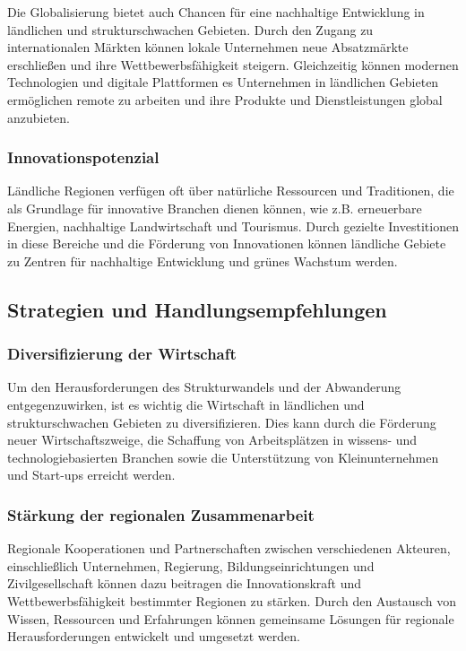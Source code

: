Die Globalisierung bietet auch Chancen für eine nachhaltige Entwicklung in ländlichen und strukturschwachen Gebieten. Durch den Zugang zu internationalen Märkten können lokale Unternehmen neue Absatzmärkte erschließen und ihre Wettbewerbsfähigkeit steigern. Gleichzeitig können modernen Technologien und digitale Plattformen es Unternehmen in ländlichen Gebieten ermöglichen remote zu arbeiten und ihre Produkte und Dienstleistungen global anzubieten.

\subsubsection{Innovationspotenzial}

Ländliche Regionen verfügen oft über natürliche Ressourcen und Traditionen, die als Grundlage für innovative Branchen dienen können, wie z.B. erneuerbare Energien, nachhaltige Landwirtschaft und Tourismus. Durch gezielte Investitionen in diese Bereiche und die Förderung von Innovationen können ländliche Gebiete zu Zentren für nachhaltige Entwicklung und grünes Wachstum werden.

\subsection{Strategien und Handlungsempfehlungen}

\subsubsection{Diversifizierung der Wirtschaft}

Um den Herausforderungen des Strukturwandels und der Abwanderung entgegenzuwirken, ist es wichtig die Wirtschaft in ländlichen und strukturschwachen Gebieten zu diversifizieren. Dies kann durch die Förderung neuer Wirtschaftszweige, die Schaffung von Arbeitsplätzen in wissens- und technologiebasierten Branchen sowie die Unterstützung von Kleinunternehmen und Start-ups erreicht werden.

\subsubsection{Stärkung der regionalen Zusammenarbeit}

Regionale Kooperationen und Partnerschaften zwischen verschiedenen Akteuren, einschließlich Unternehmen, Regierung, Bildungseinrichtungen und Zivilgesellschaft können dazu beitragen die Innovationskraft und Wettbewerbsfähigkeit bestimmter Regionen zu stärken. Durch den Austausch von Wissen, Ressourcen und Erfahrungen können gemeinsame Lösungen für regionale Herausforderungen entwickelt und umgesetzt werden.

